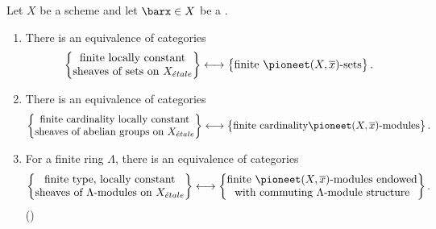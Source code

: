 \begin{theorem} \label{theorem:locally_constant_sheaves_on_X_etale_are_equivalent_to_representations_of_the_etale_fundamental_group} 
    Let $X$ be a  scheme and let $\barx \in X$ be a .
    \begin{enumerate}
        \item There is an equivalence of categories
        \[
        \left\{
        \begin{matrix}
        \text{finite locally constant} \\
        \text{sheaves of sets on } X_{\acute{e}tale}
        \end{matrix}
        \right\}
        \longleftrightarrow
        \left\{
        \begin{matrix}
        \text{finite } \pioneet(X, \overline{x})\text{-sets}
        \end{matrix}
        \right\}.
        \]

        \item There is an equivalence of categories
        \[
        \left\{
        \begin{matrix}
        \text{finite cardinality locally constant} \\
        \text{sheaves of abelian groups on } X_{\acute{e}tale}
        \end{matrix}
        \right\}
        \longleftrightarrow
        \left\{
        \begin{matrix}
        \text{finite cardinality} \pioneet(X, \overline{x})\text{-modules}
        \end{matrix}
        \right\}.
        \]

        \item For a finite ring $\Lambda$, there is an equivalence of categories
        \[
        \left\{
        \begin{matrix}
        \text{finite type, locally constant} \\
        \text{sheaves of } \Lambda\text{-modules on } X_{\acute{e}tale}
        \end{matrix}
        \right\}
        \longleftrightarrow
        \left\{
        \begin{matrix}
        \text{finite } \pioneet(X, \overline{x})\text{-modules endowed} \\
        \text{with commuting } \Lambda\text{-module structure}
        \end{matrix}
        \right\}.
        \]
        ()


\end{enumerate}
\end{theorem}
